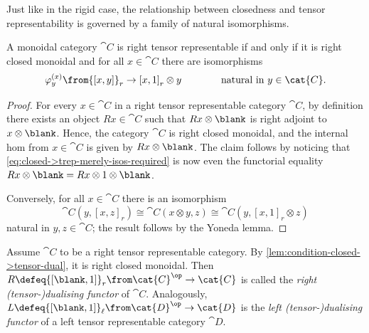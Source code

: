 Just like in the rigid case,
the relationship between closedness and tensor repre\-sentability is governed by a family of natural isomorphisms.

\begin{lemma}\label{lem:condition-closed->tensor-dual}
  A monoidal category \(\cat{C}\) is right tensor representable
  if and only if
  it is right closed monoidal and for all \(x \in\cat{C}\) there are isomorphisms
  \begin{equation}\label{eq:closed->trep-merely-isos-required}
    \varphi^{(x)}_y \from{[x,y]}_r \to {[x,1]}_r \otimes y \qquad \qquad \text{natural in } y \in\cat{C}.
  \end{equation}
\end{lemma}
\begin{proof}
  For every \(x \in \cat{C}\) in a right tensor representable category \(\cat{C}\),
  by definition there exists an object \(Rx \in \cat{C}\) such that \(Rx\otimes \blank\) is right adjoint to \(x\otimes \blank\).
  Hence, the category \(\cat{C}\) is right closed monoidal,
  and the internal hom from \(x\in \cat{C}\) is given by \(Rx \otimes \blank\).
  The claim follows by noticing that \cref{eq:closed->trep-merely-isos-required}
  is now even the functorial equality  \(Rx \otimes \blank = Rx \otimes 1 \otimes \blank \).

  Conversely, for all \(x \in \cat{C}\) there is
  an isomorphism
  \[
    \cat{C}(y, {[x,z]}_r)
    \cong \cat{C}(x\otimes y, z)
    \cong \cat{C}(y, {[x,1]}_{r}\otimes z)
  \]
  natural in \(y,z \in \cat{C}\);
  the result follows by the Yoneda lemma.
\end{proof}

\begin{definition}\label{def:tensor-dual-functors}
  Assume \(\cat{C}\) to be a right tensor representable category.
  By \cref{lem:condition-closed->tensor-dual}, it is right closed monoidal.
  Then \(R \defeq {[\blank, 1]}_r \from \cat{C}^{\op} \to \cat{C}\) is called the \emph{right (tensor-)dualising functor} of \(\cat{C}\).
  Analogously, \(L \defeq {[ \blank , 1]}_\ell\from \cat{D}^{\op} \to \cat{D}\) is the \emph{left (tensor-)dualising functor} of a left tensor representable category \(\cat{D}\).
\end{definition}

